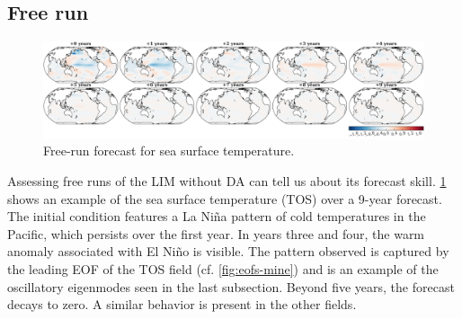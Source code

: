 \documentclass[parskip=half,DIV=16]{scrartcl}
\begin{document}
\subsection{Free run}

\begin{figure}[h]
    \centering
    \includegraphics{figures/plots/fc_free_tos_anomaly.pdf}
    \caption{Free-run forecast for sea surface temperature.}
    \label{fig:freerun-tas}
\end{figure}

Assessing free runs of the LIM without DA can tell us about its forecast skill. \cref{fig:freerun-tas} shows an example of the sea surface temperature (TOS) over a 9-year forecast. The initial condition features a La Niña pattern of cold temperatures in the Pacific, which persists over the first year. In years three and four, the warm anomaly associated with El Niño is visible. The pattern observed is captured by the leading EOF of the TOS field (cf. \cref{fig:eofs-mine}) and is an example of the oscillatory eigenmodes seen in the last subsection. Beyond five years, the forecast decays to zero. A similar behavior is present in the other fields.
\end{document}
